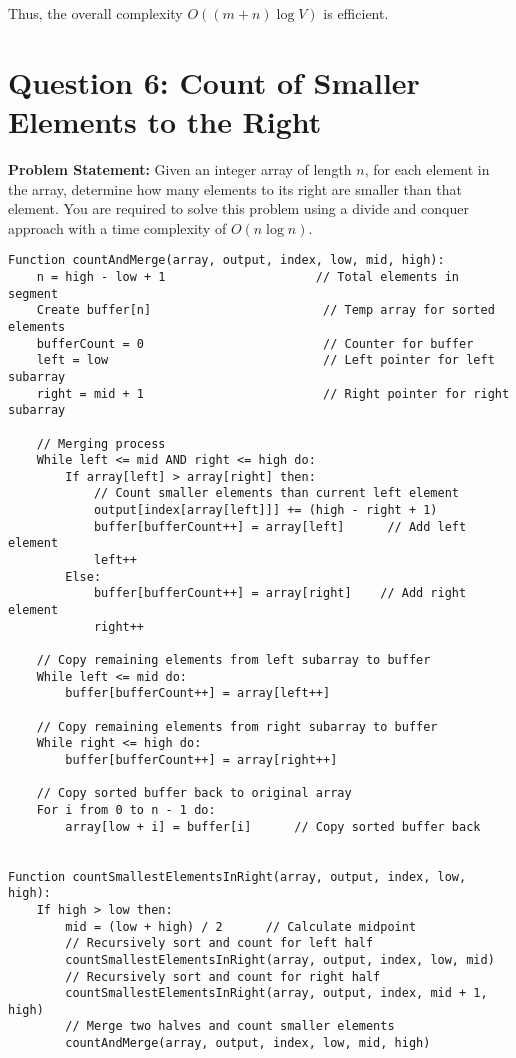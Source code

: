 \documentclass[a4paper,12pt]{report}
\begin{document}
Thus, the overall complexity $O((m + n) \log V)$ is efficient.


\vspace{200pt}
\section*{Question 6: Count of Smaller Elements to the Right}

\textbf{Problem Statement:} 
Given an integer array of length $n$, for each element in the array, determine how many elements to its right are smaller than that element. You are required to solve this problem using a divide and conquer approach with a time complexity of $O(n \log n)$.

\begin{tcolorbox}[colback=white, colframe=black, boxrule=0.5pt]
\ttfamily\small
\begin{verbatim}
Function countAndMerge(array, output, index, low, mid, high):
    n = high - low + 1                     // Total elements in segment
    Create buffer[n]                        // Temp array for sorted elements
    bufferCount = 0                         // Counter for buffer
    left = low                              // Left pointer for left subarray
    right = mid + 1                         // Right pointer for right subarray

    // Merging process
    While left <= mid AND right <= high do:
        If array[left] > array[right] then:
            // Count smaller elements than current left element
            output[index[array[left]]] += (high - right + 1)  
            buffer[bufferCount++] = array[left]      // Add left element
            left++
        Else:
            buffer[bufferCount++] = array[right]    // Add right element
            right++

    // Copy remaining elements from left subarray to buffer
    While left <= mid do: 
        buffer[bufferCount++] = array[left++]

    // Copy remaining elements from right subarray to buffer
    While right <= high do: 
        buffer[bufferCount++] = array[right++]

    // Copy sorted buffer back to original array
    For i from 0 to n - 1 do:
        array[low + i] = buffer[i]      // Copy sorted buffer back


Function countSmallestElementsInRight(array, output, index, low, high):
    If high > low then:
        mid = (low + high) / 2      // Calculate midpoint
        // Recursively sort and count for left half
        countSmallestElementsInRight(array, output, index, low, mid)     
        // Recursively sort and count for right half
        countSmallestElementsInRight(array, output, index, mid + 1, high) 
        // Merge two halves and count smaller elements
        countAndMerge(array, output, index, low, mid, high)   



\end{verbatim}
\end{tcolorbox}
\end{document}
